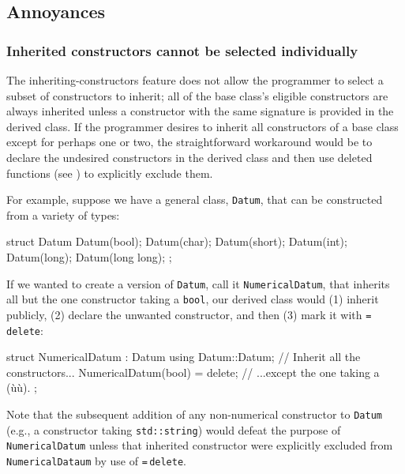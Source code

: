 \subsection[Annoyances]{Annoyances}\label{annoyances-inheritingctor}

\subsubsection[Inherited constructors cannot be selected individually]{Inherited constructors cannot be selected individually}\label{inherited-constructors-cannot-be-selected-individually}

The inheriting-constructors feature does not allow the programmer
to select a subset of constructors to inherit; all of the base
class's eligible constructors are always inherited unless a constructor
with the same signature is provided in the derived class. If the
programmer desires to inherit all constructors of a base class except
for perhaps one or two, the straightforward workaround would be to
declare the undesired constructors in the derived class and then use
deleted functions (see ) 
to explicitly exclude them.

For example, suppose we have a general class, \lstinline!Datum!, that can
be constructed from a variety of types:

\begin{emcppslisting}[emcppsbatch=e12]
struct Datum
{
    Datum(bool);
    Datum(char);
    Datum(short);
    Datum(int);
    Datum(long);
    Datum(long long);
};
\end{emcppslisting}
    
\noindent If we wanted to create a version of \lstinline!Datum!, call it
\lstinline!NumericalDatum!, that inherits all but the one constructor
taking a \lstinline!bool!, our derived class would (1) inherit publicly, 
(2) declare the unwanted constructor, and then (3) mark it with
\lstinline!=!\,\lstinline!delete!:

\begin{emcppslisting}[emcppsbatch=e12]
struct NumericalDatum : Datum
{
    using Datum::Datum;             // Inherit all the constructors...
    NumericalDatum(bool) = delete;  // ...except the one taking a (ù{}ù).
};
\end{emcppslisting}
    
\noindent Note that the subsequent addition of any non-numerical constructor to
\lstinline!Datum! (e.g., a constructor taking \lstinline!std::string!) would
defeat the purpose of \lstinline!NumericalDatum! unless that inherited constructor were explicitly excluded from \lstinline!NumericalDataum! by use of \lstinline!=!\,\lstinline!delete!.

